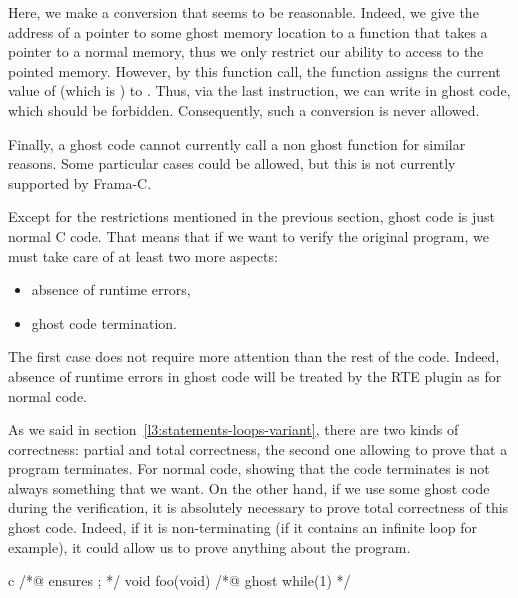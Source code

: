 

Here, we make a conversion that seems to be reasonable. Indeed, we give
the address of a pointer to some ghost memory location to a function
that takes a pointer to a normal memory, thus we only restrict our ability
to access to the pointed memory. However, by this function call, the function
 assigns the current value of  (which is
) to . Thus, via the last instruction, we
can write  in ghost code, which should be forbidden.
Consequently, such a conversion is never allowed.


Finally, a ghost code cannot currently call a non ghost function for
similar reasons. Some particular cases could be allowed, but this is
not currently supported by Frama-C.


\label{l3:acsl-logic-definitions-what-remains}


Except for the restrictions mentioned in the previous section,
ghost code is just normal C code. That means that if we want to
verify the original program, we must take care of at least two more
aspects:
\begin{itemize}
\item absence of runtime errors,
\item ghost code termination.
\end{itemize}


The first case does not require more attention than the rest of the
code. Indeed, absence of runtime errors in ghost code will be treated
by the RTE plugin as for normal code.


As we said in section~\ref{l3:statements-loops-variant}, there are two
kinds of correctness: partial and total correctness, the second one allowing
to prove that a program terminates. For normal code, showing that the code
terminates is not always something that we want. On the other hand, if we
use some ghost code during the verification, it is absolutely necessary to
prove total correctness of this ghost code. Indeed, if it is non-terminating
(if it contains an infinite loop for example), it could allow us to prove
anything about the program.


\begin{CodeBlock}{c}
/*@ ensures \false ; */
void foo(void){
  /*@ ghost
    while(1){}
  */
}
\end{CodeBlock}



